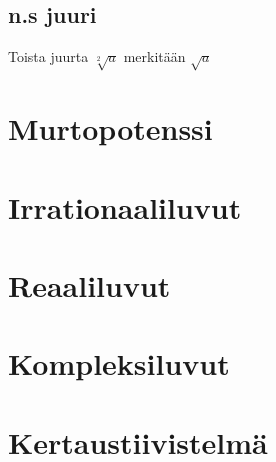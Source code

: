 \section{n.s juuri}
Toista juurta $\sqrt[2]{a}$ merkitään $\sqrt{a}$



\chapter{Murtopotenssi}
\chapter{Irrationaaliluvut}
\chapter{Reaaliluvut}
\chapter{Kompleksiluvut}
\chapter{Kertaustiivistelmä}
